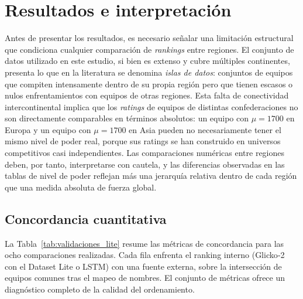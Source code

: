 \section{Resultados e interpretaci\'on}

Antes de presentar los resultados, es necesario se\~nalar una limitaci\'on estructural que condiciona cualquier comparaci\'on de \textit{rankings} entre regiones. El conjunto de datos utilizado en este estudio, si bien es extenso y cubre m\'ultiples continentes, presenta lo que en la literatura se denomina \emph{islas de datos}: conjuntos de equipos que compiten intensamente dentro de su propia regi\'on pero que tienen escasos o nulos enfrentamientos con equipos de otras regiones. Esta falta de conectividad intercontinental implica que los \textit{ratings} de equipos de distintas confederaciones no son directamente comparables en t\'erminos absolutos: un equipo con \(\mu = 1700\) en Europa y un equipo con \(\mu = 1700\) en Asia pueden no necesariamente tener el mismo nivel de poder real, porque sus ratings se han construido en universos competitivos casi independientes. Las comparaciones num\'ericas entre regiones deben, por tanto, interpretarse con cautela, y las diferencias observadas en las tablas de nivel de poder reflejan m\'as una jerarqu\'ia relativa dentro de cada regi\'on que una medida absoluta de fuerza global.

\subsection{Concordancia cuantitativa}

La Tabla~\ref{tab:validaciones_lite} resume las m\'etricas de concordancia para las ocho comparaciones realizadas. Cada fila enfrenta el ranking interno (Glicko‑2 con el Dataset Lite o LSTM) con una fuente externa, sobre la intersecci\'on de equipos comunes tras el mapeo de nombres. El conjunto de m\'etricas ofrece un diagn\'ostico completo de la calidad del ordenamiento.

